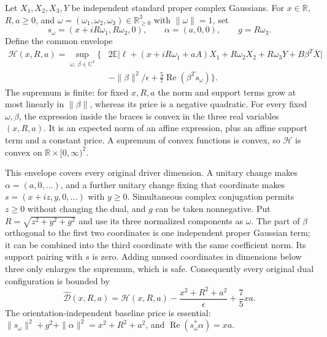Let $X_1,X_2,X_3,Y$ be independent standard proper complex Gaussians.  For
$x\in\mathbb R$, $R,a\ge0$, and
$\omega=(\omega_1,\omega_2,\omega_3)\in\mathbb R_{\ge0}^3$ with
$\|\omega\|=1$, set
\[
 s_\omega=(x+iR\omega_1,R\omega_2,0),\qquad
 \alpha=(a,0,0),\qquad g=R\omega_3.
\]
Define the common envelope
\begin{align*}
 \mathcal H(x,R,a)=\sup_{\omega,\,\beta\in\mathbb C^3}
 \biggl\{&2\mathbb E\bigl|\ell+(x+iR\omega_1+aA)X_1
                +R\omega_2X_2+R\omega_3Y+B\beta^T\overline X\bigr|\\
 &-\|\beta\|^2/\epsilon
                    +\tfrac57\operatorname{Re}(\beta^Ts_\omega)\biggr\}.
\end{align*}
The supremum is finite: for fixed $x,R,a$ the norm and support terms grow
at most linearly in $\|\beta\|$, whereas its price is a negative quadratic.
For every fixed $\omega,\beta$, the expression inside the braces is convex
in the three real variables $(x,R,a)$.  It is an expected norm of an affine
expression, plus an affine support term and a constant price.  A supremum
of convex functions is convex, so $\mathcal H$ is convex on
$\mathbb R\times[0,\infty)^2$.

This envelope covers every original driver dimension.  A unitary change
makes $\alpha=(a,0,\ldots)$, and a further unitary change fixing that
coordinate makes $s=(x+iz,y,0,\ldots)$ with $y\ge0$.  Simultaneous complex
conjugation permits $z\ge0$ without changing the dual, and $g$ can be taken
nonnegative.  Put $R=\sqrt{z^2+y^2+g^2}$ and use its three normalized
components as $\omega$.  The part of $\beta$ orthogonal to the first two
coordinates is one independent proper Gaussian term; it can be combined
into the third coordinate with the same coefficient norm.  Its support
pairing with $s$ is zero.  Adding unused coordinates in dimensions below
three only enlarges the supremum, which is safe.  Consequently every
original dual configuration is bounded by
\[
 \widehat{\mathcal D}(x,R,a)
 =\mathcal H(x,R,a)-\frac{x^2+R^2+a^2}{\epsilon}+\frac75xa.
\]
The orientation-independent baseline price is essential:
$\|s_\omega\|^2+g^2+\|\alpha\|^2=x^2+R^2+a^2$, and
$\operatorname{Re}(s_\omega^*\alpha)=xa$.

